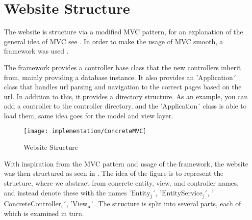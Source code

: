 \section{Website Structure}
The website is structure via a modified MVC pattern, for an explanation of the general idea of MVC see .
In order to make the usage of MVC smooth, a framework was used \citep{misc:mvc-framework}.

The framework provides a controller base class that the new controllers inherit from, mainly providing a database instance.
It also provides an 'Application´ class that handles url parsing and navigation to the correct pages based on the url.
In addition to this, it provides a directory structure. As an example, you can add a controller to the controller directory, and the 'Application´ class is able to load them, same idea goes for the model and view layer.

\begin{figure}
	\centering
	\texttt{[image: implementation/ConcreteMVC]}
	\caption{Website Structure}\label{fig:websitestructure}
\end{figure}

With inspiration from the MVC pattern and usage of the framework, the website was then structured as seen in .
The idea of the figure is to represent the structure, where we abstract from concrete entity, view, and controller names, and instead denote these with the names '$\text{Entity}_\text{j}$´, '$\text{EntityService}_\text{j}$´, '$\text{ConcreteController}_\text{i}$´, '$\text{View}_\text{u}$´.
The structure is split into several parts, each of which is examined in turn. 

